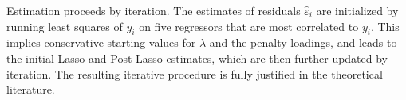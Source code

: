 \documentclass{amsart}\usepackage[]{graphicx}\usepackage[]{color}
\begin{document}
Estimation proceeds by iteration.  The estimates of residuals $\hat \varepsilon_i$ are initialized by running least squares of $y_i$ on five regressors that are most correlated to $y_i$. This implies conservative starting values for $\lambda$ and the penalty loadings, and leads to the initial Lasso and Post-Lasso estimates, which are then further updated by iteration.  The resulting iterative procedure is fully justified in the theoretical literature.

% 
% 
% 
% 
\end{document}

